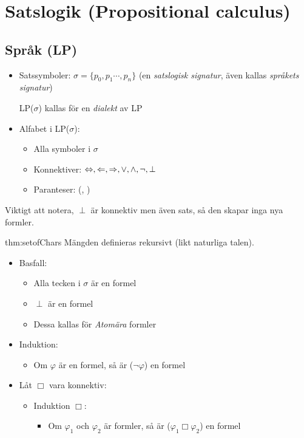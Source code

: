 \section{Satslogik (Propositional calculus)}
\subsection{Språk (LP)}

\begin{itemize}
  \item Satssymboler: $\sigma = \{p_0, p_1\cdots,p_n\}$ (en \textit{satslogisk signatur}, även kallas \textit{språkets signatur})
    \par\bigskip
    LP($\sigma$) kallas för en \textit{dialekt} av LP
  \item Alfabet i LP($\sigma$):
    \begin{itemize}
      \item Alla symboler i $\sigma$
      \item Konnektiver: $\Leftrightarrow, \Leftarrow, \Rightarrow, \vee, \wedge, \neg, \perp$
      \item Paranteser: (, )
    \end{itemize}
\end{itemize}
\par\bigskip

\noindent Viktigt att notera, $\perp$ är konnektiv men även sats, så den skapar inga nya formler.
\par\bigskip


\begin{theo}{thm:setofChars}
  Mängden definieras rekursivt (likt naturliga talen).
  \par\bigskip
  \begin{itemize}
    \item Basfall:
      \begin{itemize}
        \item Alla tecken i $\sigma$ är en formel
        \item $\perp$ är en formel
        \item Dessa kallas för \textit{Atomära} formler
      \end{itemize}
    \item Induktion:
      \begin{itemize}
        \item Om $\varphi$ är en formel, så är ($\neg\varphi$) en formel
      \end{itemize}
    \item Låt $\Box$ vara konnektiv:
      \begin{itemize}
        \item Induktion $\Box$:
          \begin{itemize}
            \item Om $\varphi_1$ och $\varphi_2$ är formler, så är ($\varphi_1\Box\varphi_2$) en formel
          \end{itemize}
      \end{itemize}
  \end{itemize}
\end{theo}
\par\bigskip


